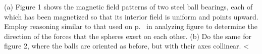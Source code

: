 (a) Figure 1 shows the magnetic field patterns of two steel ball bearings, each of which
has been magnetized so that its interior field is uniform and points upward.
Employ reasoning similar to that used on p.~\pageref{fig:two-charges-pressure-and-tension}
in analyzing figure  to determine the direction
of the forces that the spheres exert on each other.\hwendpart
(b) Do the same for figure 2, where the balls are oriented as before, but with their
axes collinear.\hwendpart
<%
